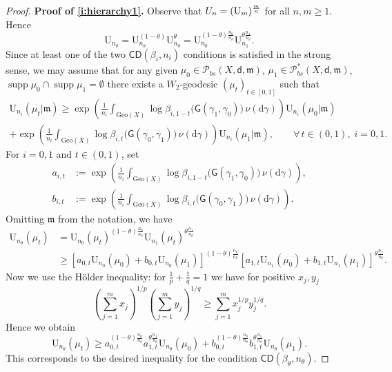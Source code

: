 \documentclass[11pt,a4paper]{article}
\theoremstyle{plain}
\theoremstyle{definition}
\theoremstyle{remark}
\numberwithin{equation}{section}
\DeclareMathOperator{\supp}{\mathrm{supp}}
\newcommand{\CD}{\mathsf{CD}}
\newcommand{\Geo}{\mathrm{Geo}}
\newcommand{\U}{\mathrm{U}}
\newcommand{\Prob}{\mathcal{P}}
\newcommand{\di}{\mathrm{d}}
\newcommand{\mm}{\mathfrak m}
\newcommand{\sfd}{\mathsf d}
\newcommand{\sfG}{\mathsf G}
\begin{document}
\begin{proof}
\textbf{Proof of \ref{i:hierarchy1}.} Observe that $\mathrm \U_{n}= (\U_m)^{\frac{m}{n}}$ for all $n,m\geq 1$. Hence
\begin{equation}
\U_{n_{\theta}}=\U_{n_{\theta}}^{(1-\theta)} \U_{n_{\theta}}^{\theta}=\mathrm U_{n_{0}}^{(1-\theta)\frac{n_{0}}{n_{\theta}}}\mathrm U_{n_{1}}^{\theta\frac{n_{1}}{n_{\theta}}}.
\end{equation}
Since at least one of the two $\CD(\beta_i,n_i)$ conditions is satisfied in the strong sense, we may assume that for any given $\mu_0\in\Prob_{bs}(X,\sfd,\mm)$, $\mu_1\in \Prob_{bs}^*(X,\sfd,\mm)$,  $\supp \mu_0\cap \supp \mu_1 =\emptyset$ there exists a $W_2$-geodesic $(\mu_t)_{t\in [0,1]}$ such that
\begin{multline}
\U_{n_i}(\mu_t|\mm) \geq \exp\left(\frac{1}{n_i} \int_{\Geo(X)} \log\beta_{i,1-t}\big(\sfG(\gamma_1,\gamma_0)\big)\,\nu(\di\gamma) \right) \U_{n_i}(\mu_0|\mm) \\
+ \exp\left(\frac{1}{n_i} \int_{\Geo(X)} \log\beta_{i,t}\big(\sfG(\gamma_0,\gamma_1)\big)\,\nu(\di\gamma) \right) \U_{n_i}(\mu_1|\mm),\qquad \forall\, t\in(0,1),\; i=0,1.
\end{multline}
For $i=0,1$ and $t\in (0,1)$, set 
\begin{align*}
a_{i,t}&:= \exp\left(\frac{1}{n_i} \int_{\Geo(X)} \log\beta_{i,1-t}\big(\sfG(\gamma_1,\gamma_0)\big)\,\nu(\di\gamma) \right),\\
b_{i,t}&:= \exp\left(\frac{1}{n_i} \int_{\Geo(X)} \log\beta_{i,t}\big(\sfG(\gamma_0,\gamma_1)\big)\,\nu(\di\gamma) \right).
\end{align*}
Omitting $\mm$ from the notation, we have
\begin{align}
\U_{n_\theta}(\mu_t) & = \U_{n_0}(\mu_t)^{(1-\theta)\tfrac{n_0}{n_\theta}}\U_{n_1}(\mu_t)^{\theta\tfrac{n_1}{n_\theta}} \\
& \geq \left[  a_{0,t} \U_{n_0}(\mu_0) + b_{0,t} \U_{n_0}(\mu_1)\right]^{(1-\theta)\tfrac{n_0}{n_\theta}}\left[  a_{1,t} \U_{n_1}(\mu_0) + b_{1,t} \U_{n_1}(\mu_1)\right]^{\theta\tfrac{n_1}{n_\theta}}.
\end{align}
Now we use the H\"older inequality: for $\frac{1}{p}+\frac{1}{q}=1$ we have for positive $x_j,y_j$
\begin{equation}
\left(\sum_{j=1}^{m} x_{j}\right)^{1/p}\left(\sum_{j=1}^{m} y_{j}\right)^{1/q}\geq \sum_{j=1}^{m} x_{j}^{1/p}y_{j}^{1/q}.
\end{equation}
Hence we obtain
\begin{equation}
\U_{n_\theta}(\mu_t) \geq a_{0,t}^{(1-\theta)\tfrac{n_0}{n_\theta}} a_{1,t}^{\theta\tfrac{n_1}{n_\theta}} \U_{n_\theta}(\mu_0)+b_{0,t}^{(1-\theta)\tfrac{n_0}{n_\theta}} b_{1,t}^{\theta\tfrac{n_1}{n_\theta}} \U_{n_\theta}(\mu_1).
\end{equation}
This corresponds to the desired inequality for the condition $\CD(\beta_\theta,n_\theta)$. 


\end{proof}
\end{document}
